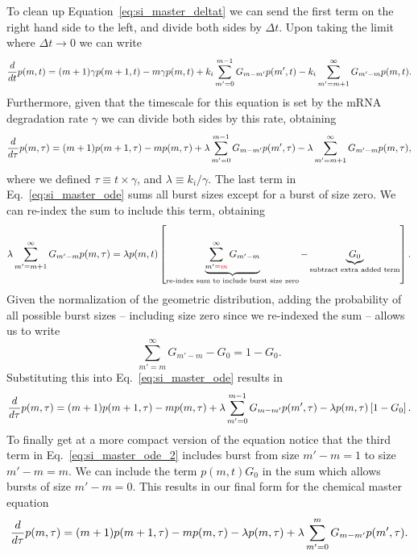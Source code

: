 To clean up Equation~\ref{eq:si_master_deltat} we can send the first term on the
right hand side to the left, and divide both sides by $\Delta t$. Upon taking
the limit where $\Delta t \rightarrow 0$ we can write
\begin{equation}
{d \over dt}p(m, t) = (m + 1) \gamma p(m + 1, t)
- m \gamma p(m, t)
+ k_i \sum_{m'=0}^{m-1} G_{m-m'} p(m', t) 
- k_i \sum_{m'=m + 1}^{\infty} G_{m'-m} p(m, t).
\end{equation}
Furthermore, given that the timescale for this equation is set by the mRNA
degradation rate $\gamma$ we can divide both sides by this rate, obtaining
\begin{equation}
{d \over d\tau}p(m, \tau) = (m + 1) p(m + 1, \tau)
- m p(m, \tau)
+ \lambda \sum_{m'=0}^{m-1} G_{m-m'} p(m', \tau) 
- \lambda \sum_{m'=m + 1}^{\infty} G_{m'-m} p(m, \tau),
\label{eq:si_master_ode}
\end{equation}
where we defined $\tau \equiv t \times \gamma$, and $\lambda \equiv k_i/\gamma$.
The last term in Eq.~\ref{eq:si_master_ode} sums all burst sizes except for a 
burst of size zero. We can re-index the sum to include this term, obtaining
\begin{equation}
\lambda \sum_{m'=m + 1}^{\infty} G_{m'-m} p(m, \tau) = \lambda p(m, t) \left[
\underbrace{\sum_{m'=\textcolor{red}{m}}^{\infty}G_{m'-m}}
_{\text{re-index sum to include burst size zero}} -
\underbrace{G_0}_{\text{subtract extra added term}}\right].
\end{equation}
Given the normalization of the geometric distribution, adding the probability of
all possible burst sizes -- including size zero since we re-indexed the sum --
allows us to write
\begin{equation}
\sum_{m'=m}^{\infty}G_{m'-m} - G_0 = 1 - G_0.
\end{equation}
Substituting this into Eq.~\ref{eq:si_master_ode} results in
\begin{equation}
{d \over d\tau}p(m, \tau) = (m + 1) p(m + 1, \tau)
- m p(m, \tau)
+ \lambda \sum_{m'=0}^{m-1} G_{m-m'} p(m', \tau) 
- \lambda p(m, \tau) \left[ 1 - G_0 \right].
\label{eq:si_master_ode_2}
\end{equation}
To finally get at a more compact version of the equation notice that the third
term in Eq.~\ref{eq:si_master_ode_2} includes burst from size $m'-m = 1$ to size
$m' - m = m$. We can include the term $p(m, t) G_0$ in the sum which allows
bursts of size $m' - m = 0$. This results in our final form for the chemical
master equation
\begin{align}
{d \over d\tau}p(m, \tau) = 
(m + 1) p(m+1, \tau)
- m p(m, \tau) - 
\lambda p(m, \tau)
+ \lambda \sum_{m^\prime=0}^m G_{m-m^\prime} p(m^\prime, \tau).
\label{eq:si_master_unreg}
\end{align}

